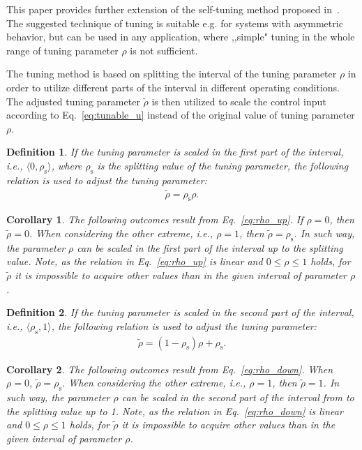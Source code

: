 \documentclass[preprint,12pt]{elsarticle}
\newtheorem{corollary}{Corollary}[theorem]
\newtheorem{definition}{Definition}[section]
\begin{document}
This paper provides further extension of the self-tuning method proposed in~\cite{self_tunable}. The suggested technique of tuning is suitable e.g. for systems with asymmetric behavior, but can be used in any application, where ,,simple" tuning in the whole range of tuning parameter $\rho$ is not sufficient.

The tuning method is based on splitting the interval of the tuning parameter $\rho$ in order to utilize different parts of the interval in different operating conditions. The adjusted tuning parameter $\widetilde{\rho}$ is then utilized to scale the control input according to Eq.~\eqref{eq:tunable_u} instead of the original value of tuning parameter $\rho$.     

\begin{definition}
	If the tuning parameter is scaled in the first part of the interval, i.e., $\langle 0, \rho_{\mathrm{s}} \rangle$, where $\rho_{\mathrm{s}}$ is the splitting value of the tuning parameter, the following relation is used to adjust the tuning parameter:
	\begin{eqnarray}
		\label{eq:rho_up}
		\widetilde{\rho} = \rho_{\mathrm{s}} \rho.
	\end{eqnarray}
\end{definition}

\begin{corollary}
	The following outcomes result from Eq.~\eqref{eq:rho_up}. If $\rho=0$, then $\widetilde{\rho} = 0$. When considering the other extreme, i.e., $\rho=1$, then $\widetilde{\rho} = \rho_{\mathrm{s}}$. In such way, the parameter $\rho$ can be scaled in the first part of the interval up to the splitting value. Note, as the relation in Eq.~\eqref{eq:rho_up} is linear and $0 \le \rho \le 1$ holds, for $\widetilde{\rho}$ it is impossible to acquire other values than in the given interval of parameter $\rho$.   
\end{corollary}

\begin{definition}
	If the tuning parameter is scaled in the second part of the interval, i.e., $\langle \rho_{\mathrm{s}}, 1 \rangle$, the following relation is used to adjust the tuning parameter:	
	\begin{eqnarray}
		\label{eq:rho_down}
		\widetilde{\rho} = (1-\rho_{\mathrm{s}}) \rho + \rho_{\mathrm{s}}.
	\end{eqnarray}
\end{definition}

\begin{corollary}
	The following outcomes result from Eq.~\eqref{eq:rho_down}. When $\rho=0$, $\widetilde{\rho} = \rho_{\mathrm{s}}$. When considering the other extreme, i.e., $\rho=1$, then $\widetilde{\rho} = 1$. In such way, the parameter $\rho$ can be scaled in the second part of the interval from to the splitting value up to 1. Note, as the relation in Eq.~\eqref{eq:rho_down} is linear and $0 \le \rho \le 1$ holds, for $\widetilde{\rho}$ it is impossible to acquire other values than in the given interval of parameter $\rho$.
\end{corollary}
\end{document}
